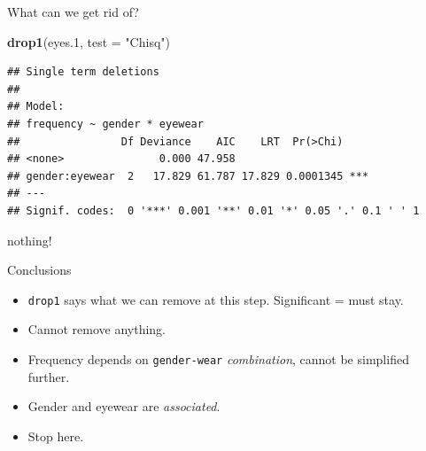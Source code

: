 \documentclass[ignorenonframetext,]{beamer}
\newenvironment{Shaded}{\begin{snugshade}}{\end{snugshade}}
\newcommand{\DataTypeTok}[1]{\textcolor[rgb]{0.13,0.29,0.53}{#1}}
\newcommand{\FloatTok}[1]{\textcolor[rgb]{0.00,0.00,0.81}{#1}}
\newcommand{\KeywordTok}[1]{\textcolor[rgb]{0.13,0.29,0.53}{\textbf{#1}}}
\newcommand{\NormalTok}[1]{#1}
\newcommand{\StringTok}[1]{\textcolor[rgb]{0.31,0.60,0.02}{#1}}
\begin{document}
\begin{frame}[fragile]{What can we get rid of?}
\protect\hypertarget{what-can-we-get-rid-of}{}

\small

\begin{Shaded}
\begin{Highlighting}[]
\KeywordTok{drop1}\NormalTok{(eyes}\FloatTok{.1}\NormalTok{, }\DataTypeTok{test =} \StringTok{"Chisq"}\NormalTok{)}
\end{Highlighting}
\end{Shaded}

\begin{verbatim}
## Single term deletions
## 
## Model:
## frequency ~ gender * eyewear
##                Df Deviance    AIC    LRT  Pr(>Chi)    
## <none>               0.000 47.958                     
## gender:eyewear  2   17.829 61.787 17.829 0.0001345 ***
## ---
## Signif. codes:  0 '***' 0.001 '**' 0.01 '*' 0.05 '.' 0.1 ' ' 1
\end{verbatim}

nothing!

\end{frame}

\begin{frame}[fragile]{Conclusions}
\protect\hypertarget{conclusions-4}{}

\begin{itemize}
\item
  \texttt{drop1} says what we can remove at this step. Significant =
  must stay.
\item
  Cannot remove anything.
\item
  Frequency depends on \texttt{gender-wear} \emph{combination}, cannot
  be simplified further.
\item
  Gender and eyewear are \emph{associated}.
\item
  Stop here.
\end{itemize}

\end{frame}
\end{document}
